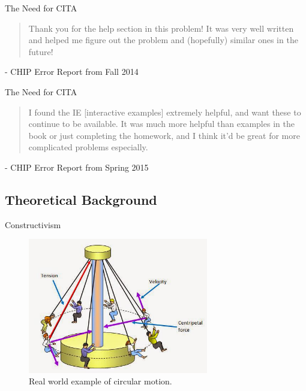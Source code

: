 \documentclass[xcolor=x11names,compress]{beamer}
\begin{document}
\begin{frame}{The Need for CITA}
	\begin{quote}
	Thank you for the help section in this problem! It was very well written and helped me figure out the problem and (hopefully) similar ones in the future!
	\end{quote}
	\vspace{5mm}
	- CHIP Error Report from Fall 2014
\end{frame}

\begin{frame}{The Need for CITA}
	\begin{quote}
	I found the IE [interactive examples] extremely helpful, and want these to continue to be available. It was much more helpful than examples in the book or just completing the homework, and I think it'd be great for more complicated problems especially.
	\end{quote}
	\vspace{5mm}
	- CHIP Error Report from Spring 2015
\end{frame}

\subsection{Theoretical Background}

\begin{frame}{Constructivism}
	\begin{figure}
		\centering
		\includegraphics[width=0.7\textwidth]{img/constructivism_circular_motion.png}
		\caption{Real world example of circular motion.}
		\label{fig:constructivism_example_part_1}
	\end{figure}
\end{frame}
\end{document}
